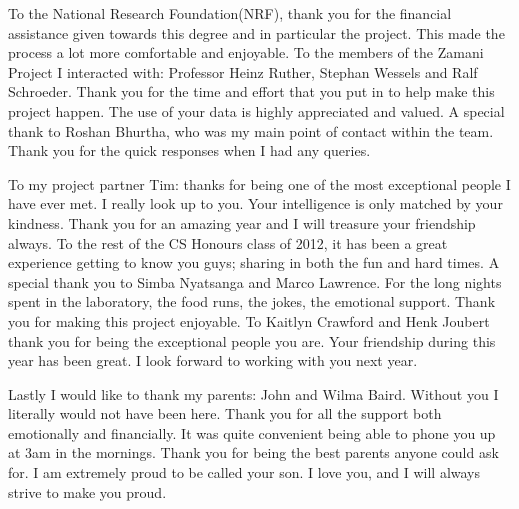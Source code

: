 \documentclass[12pt,a4paper]{report}
\begin{document}
To the National Research Foundation(NRF), thank you for the financial assistance
given towards this degree and in particular the project. This made the process
a lot more comfortable and enjoyable. To the members of the Zamani Project I
interacted with: Professor Heinz Ruther, Stephan Wessels and Ralf Schroeder. 
Thank you for the time and effort that you put in to help make this project
happen. The use of your data is highly appreciated and valued. A special thank 
to Roshan Bhurtha, who was my main point of contact within the team. Thank you
for the quick responses when I had any queries.

To my project partner Tim: thanks for being one of the most exceptional people I
have ever met. I really look up to you. Your intelligence is only matched by
your kindness. Thank you for an amazing year and I will treasure your friendship
always. To the rest of the CS Honours class of 2012, it has been a great
experience getting to know you guys; sharing in both the fun and hard times. 
A special thank you to Simba Nyatsanga and Marco Lawrence. For
the long nights spent in the laboratory, the food runs, the jokes, the emotional
support. Thank you for making this project enjoyable. To Kaitlyn Crawford and 
Henk Joubert thank you for being the exceptional people you are. Your friendship
during this year has been great. I look forward to working with you next year.

Lastly I would like to thank my parents: John and Wilma Baird. Without you I
literally would not have been here. Thank you for all the support both
emotionally and financially. It was quite convenient being able to phone you up
at 3am in the mornings. Thank you for being the best parents anyone could ask
for. I am extremely proud to be called your son. I love you, and I will always
strive to make you proud.



\tableofcontents
\newpage
\listoffigures
\newpage
{}



 











{}

\appendix

\end{document}

